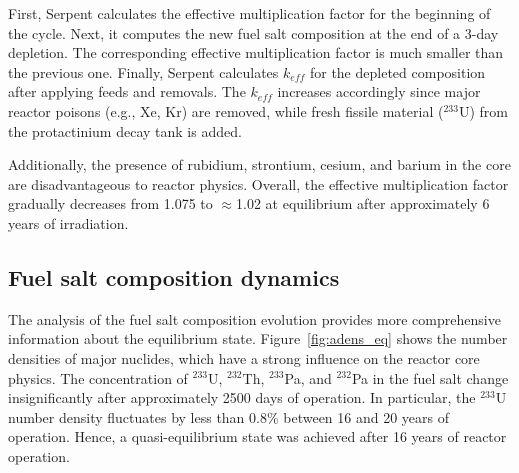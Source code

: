 First, Serpent calculates the effective multiplication factor for the  
beginning of the cycle. 
Next, it computes the new fuel salt composition at the end of a 3-day 
depletion. The corresponding effective multiplication factor is much smaller 
than the previous one. Finally, Serpent calculates $k_{eff}$ for the depleted 
composition after applying feeds and removals. The $k_{eff}$ increases 
accordingly since major reactor poisons (e.g., Xe, Kr) are removed, while 
fresh fissile material ($^{233}$U) from the protactinium decay tank is added.  

Additionally, the presence of rubidium, strontium, cesium, and barium in the 
core are disadvantageous to reactor physics. Overall, the effective 
multiplication factor gradually decreases from 1.075 to $\approx$1.02 at 
equilibrium after approximately 6 years of irradiation. 



\subsection{Fuel salt composition dynamics}\label{sec:ch3-msbr-fuel-comp}
The analysis of the fuel salt composition evolution provides more 
comprehensive information about the equilibrium state. 
Figure~\ref{fig:adens_eq} shows the number densities of major nuclides, which 
have a strong influence on the reactor core physics. The concentration of 
$^{233}$U, $^{232}$Th, $^{233}$Pa, and $^{232}$Pa in the fuel salt change 
insignificantly after approximately 2500 days of operation. In particular, the 
$^{233}$U number density fluctuates by less than 0.8\% between 16 and 20 years 
of operation. Hence, a quasi-equilibrium state was achieved after 16 years of 
reactor operation.

